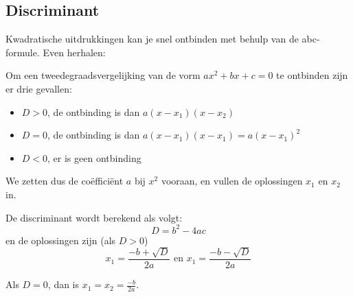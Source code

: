 \subsection{Discriminant}
Kwadratische uitdrukkingen kan je snel ontbinden met behulp van de abc-formule. Even herhalen:

\begin{definitie}
	Om een tweedegraadsvergelijking van de vorm $ax^2+bx+c=0$ te ontbinden zijn er drie gevallen:

\begin{itemize}
	\item $D>0$, de ontbinding is dan $a(x-x_1)(x-x_2)$
	\item $D=0$, de ontbinding is dan $a(x-x_1)(x-x_1)=a(x-x_1)^2$
	\item $D<0$, er is geen ontbinding
\end{itemize}

We zetten dus de co\"effici\"ent $a$ bij $x^2$ vooraan, en vullen de oplossingen  $x_1$ en $x_2$ in.

De discriminant wordt berekend als volgt:
\begin{equation*}
D=b^2-4ac
\end{equation*}
en de oplossingen zijn (als $D>0$)
\begin{equation*}
x_1=\frac{-b+\sqrt{D}}{2a} \text{ en } x_1=\frac{-b-\sqrt{D}}{2a}
\end{equation*}

Als $D=0$, dan is $x_1=x_2=\frac{-b}{2a}$.

\end{definitie}

